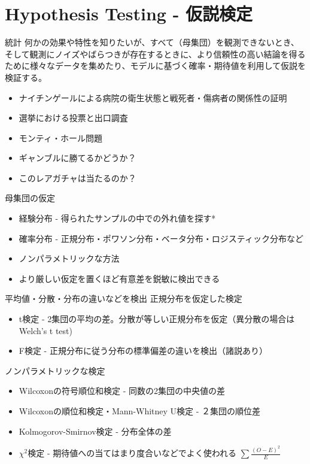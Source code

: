 \documentclass[cjk, aspectratio=169]{beamer}
\begin{document}
\section{Hypothesis Testing - 仮説検定}
    \begin{frame}{統計}
    何かの効果や特性を知りたいが、すべて（母集団）を観測できないとき、そして観測にノイズやばらつきが存在するときに、より信頼性の高い結論を得るために様々なデータを集めたり、モデルに基づく確率・期待値を利用して仮説を検証する。
    \begin{itemize}
    \item ナイチンゲールによる病院の衛生状態と戦死者・傷病者の関係性の証明
    \item 選挙における投票と出口調査
    \item モンティ・ホール問題
    \item ギャンブルに勝てるかどうか？
    \item このレアガチャは当たるのか？
    \end{itemize}
    \end{frame}

    \begin{frame}{母集団の仮定}
    \begin{itemize}
    \item 経験分布 - 得られたサンプルの中での外れ値を探す*
    \item 確率分布 - 正規分布・ポワソン分布・ベータ分布・ロジスティック分布など
    \item ノンパラメトリックな方法
    \item より厳しい仮定を置くほど有意差を鋭敏に検出できる
    \end{itemize}
    \end{frame}

    \begin{frame}{平均値・分散・分布の違いなどを検出}
    正規分布を仮定した検定
    \begin{itemize}
    \item t検定 - 2集団の平均の差。分散が等しい正規分布を仮定（異分散の場合はWelch's t test)
    \item F検定 - 正規分布に従う分布の標準偏差の違いを検出（諸説あり）
    \end{itemize}
    ノンパラメトリックな検定
    \begin{itemize}
    \item Wilcoxonの符号順位和検定 - 同数の2集団の中央値の差
    \item Wilcoxonの順位和検定・Mann-Whitney U検定 - ２集団の順位差
    \item Kolmogorov-Smirnov検定 - 分布全体の差
    \item $\chi^{2}$検定 - 期待値への当てはまり度合いなどでよく使われる $\sum \frac{(O-E)^2}{E}$
    \end{itemize}
    \end{frame}
\end{document}
